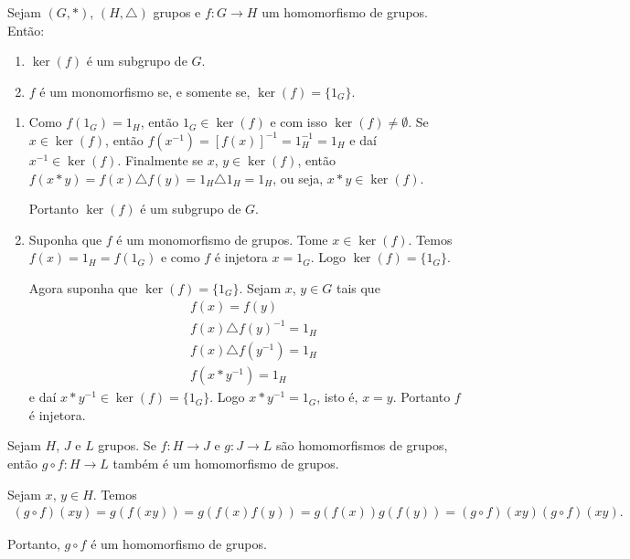 \begin{proposicao}
    Sejam $(G, *)$, $(H, \triangle)$ grupos e $f : G \to H$ um homomorfismo de grupos. Então:
    \begin{enumerate}[label={\roman*})]
        \item $\ker(f)$ é um subgrupo de $G$.
        \item $f$ é um monomorfismo se, e somente se, $\ker(f) = \{1_G\}$.
    \end{enumerate}
\end{proposicao}
\begin{prova}
    \begin{enumerate}[label={\roman*})]
        \item Como $f(1_G) = 1_H$, então $1_G \in \ker(f)$ e com isso $\ker(f) \ne \emptyset$. Se $x \in \ker(f)$, então $f(x^{-1}) = [f(x)]^{-1} = 1_H^{-1} = 1_H$ e daí $x^{-1} \in \ker(f)$. Finalmente se $x$, $y \in \ker(f)$, então $f(x*y) = f(x)\triangle f(y) = 1_H \triangle 1_H = 1_H$, ou seja, $x * y \in \ker(f)$.

        Portanto $\ker(f)$ é um subgrupo de $G$.

        \item Suponha que $f$ é um monomorfismo de grupos. Tome $x \in \ker(f)$. Temos $f(x) = 1_H = f(1_G)$ e como $f$ é injetora $x = 1_G$. Logo $\ker(f) = \{1_G\}$.

        Agora suponha que $\ker(f) = \{1_G\}$. Sejam $x$, $y \in G$ tais que
        \begin{align*}
            &f(x) = f(y)\\
            &f(x)\triangle f(y)^{-1} = 1_H\\
            &f(x)\triangle f(y^{-1}) = 1_H\\
            &f(x * y^{-1}) = 1_H
        \end{align*}
        e daí $x*y^{-1} \in \ker(f) = \{1_G\}$. Logo $x*y^{-1} = 1_G$, isto é, $x = y$. Portanto $f$ é injetora.
    \end{enumerate}
\end{prova}

\begin{proposicao}
    Sejam $H$, $J$ e $L$ grupos. Se $f : H \to J$ e $g : J \to L$ são homomorfismos de grupos, então $g \circ f : H \to L$ também é um homomorfismo de grupos.
\end{proposicao}
\begin{prova}
    Sejam $x$, $y \in H$. Temos
    \begin{align*}
        (g \circ f)(xy) = g(f(xy)) = g(f(x)f(y)) = g(f(x))g(f(y)) = (g \circ f)(xy)(g \circ f)(xy).
    \end{align*}

    Portanto, $g \circ f$ é um homomorfismo de grupos.
\end{prova}


